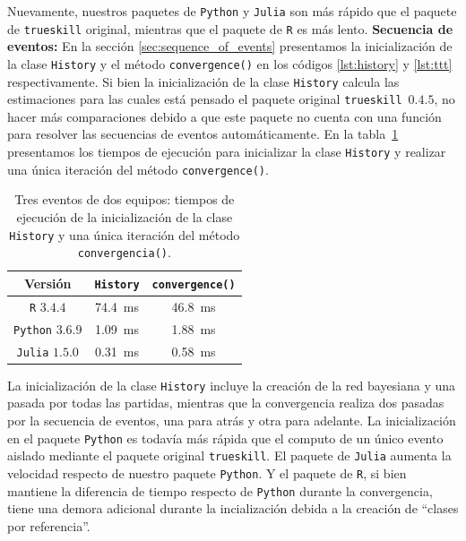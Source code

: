 \documentclass[a4paper,11pt]{book}
\theoremstyle{definition}
\begin{document}
%
Nuevamente, nuestros paquetes de \texttt{Python} y \texttt{Julia} son más rápido que el paquete de \texttt{trueskill} original, mientras que el paquete de \texttt{R} es más lento.
\textbf{Secuencia de eventos:}
%
En la secci\'on \ref{sec:sequence_of_events} presentamos la inicializaci\'on de la clase \texttt{History} y el método \texttt{convergence()} en los c\'odigos \ref{lst:history} y \ref{lst:ttt} respectivamente.
%
Si bien la inicializaci\'on de la clase \texttt{History} calcula las estimaciones para las cuales está pensado el paquete original \texttt{trueskill}~$0.4.5$, no hacer más comparaciones debido a que este paquete no cuenta con una funci\'on para resolver las secuencias de eventos automáticamente.
%
En la tabla~\ref{Tab:Sequence} presentamos los tiempos de ejecuci\'on para inicializar la clase \texttt{History} y realizar una \'unica iteraci\'on del método \texttt{convergence()}.
%
\begin{table}[ht!] \centering
    \begin{tabular}{ccc}
        Versi\'on & \texttt{History} & \texttt{convergence()} \\ \hline
        \texttt{R} $3.4.4$        & \SI{74.4}{\ms}   & \SI{46.8}{\ms} \\
        \hline
        \texttt{Python} $3.6.9$   & \SI{1.09}{\ms}    & \SI{1.88}{\ms} \\
        \hline
        \texttt{Julia} $1.5.0$    &  \SI{0.31}{\ms}   & \SI{0.58}{\ms} \\
        \hline
    \end{tabular}
    \caption{
     Tres eventos de dos equipos: tiempos de ejecuci\'on de la inicializaci\'on de la clase \texttt{History} y una \'unica iteraci\'on del método \texttt{convergencia()}.
    }
    \label{Tab:Sequence}
\end{table}
%
La inicializaci\'on de la clase \texttt{History} incluye la creaci\'on de la red bayesiana y una pasada por todas las partidas, mientras que la convergencia realiza dos pasadas por la secuencia de eventos, una para atrás y otra para adelante.
%
La inicializaci\'on en el paquete \texttt{Python} es todavía más rápida que el computo de un \'unico evento aislado mediante el paquete original \texttt{trueskill}.
%
El paquete de \texttt{Julia} aumenta la velocidad respecto de nuestro paquete \texttt{Python}.
%
Y el paquete de \texttt{R}, si bien mantiene la diferencia de tiempo respecto de \texttt{Python} durante la convergencia, tiene una demora adicional durante la incializaci\'on debida a la creaci\'on de ``clases por referencia''.
\end{document}
